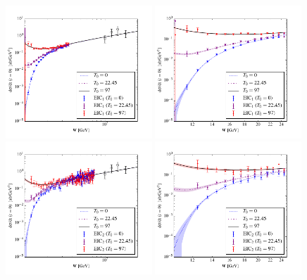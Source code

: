 \documentclass[10pt,prd,aps,nofootinbib,superscriptaddress]{revtex4}
\begin{document}
\begin{figure}
\includegraphics[width=0.49\textwidth]{dsdt_y_eic1.pdf}
\includegraphics[width=0.49\textwidth]{dsdt_y_close_eic1.pdf}
\includegraphics[width=0.49\textwidth]{dsdt_y_eic2.pdf}
\includegraphics[width=0.49\textwidth]{dsdt_y_close_eic2.pdf}

\end{figure}
\end{document}
